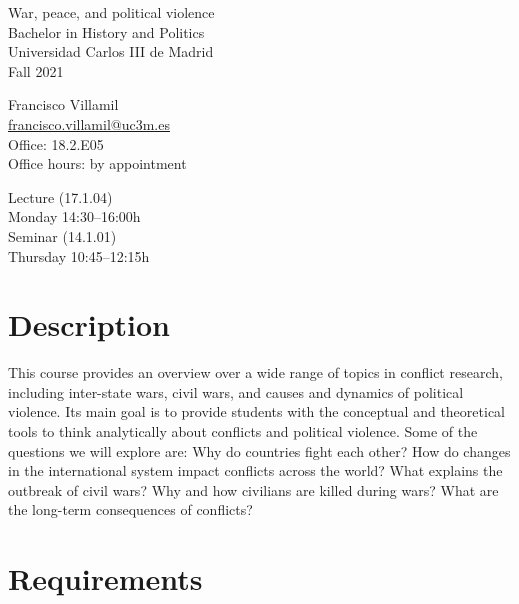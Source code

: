 \documentclass[12pt, a4paper]{article}
\begin{document}
\begin{center}
{\Large War, peace, and political violence}\\\vspace{10pt}
Bachelor in History and Politics\\
Universidad Carlos III de Madrid\\
Fall 2021\\
\end{center}

\vspace{20pt}

\begin{minipage}{0.49\textwidth}
\centering
Francisco Villamil\\
\href{francisco.villamil@uc3m.es}{francisco.villamil@uc3m.es}\\
Office: 18.2.E05\\
Office hours: by appointment
\end{minipage}\hfill
\begin{minipage}{0.49\textwidth}
\centering
Lecture (17.1.04)\\Monday 14:30--16:00h\\\vspace{5pt}
Seminar (14.1.01)\\Thursday 10:45--12:15h\\
\end{minipage}


\vspace{10pt}
\section{Description}

This course provides an overview over a wide range of topics in conflict research, including inter-state wars, civil wars, and causes and dynamics of political violence.
Its main goal is to provide students with the conceptual and theoretical tools to think analytically about conflicts and political violence. Some of the questions we will explore are: Why do countries fight each other? How do changes in the international system impact conflicts across the world? What explains the outbreak of civil wars? Why and how civilians are killed during wars? What are the long-term consequences of conflicts?

\section{Requirements}
\end{document}
